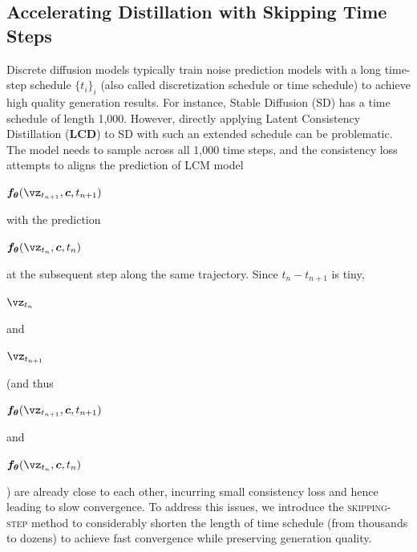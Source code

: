 \documentclass{article} %
\begin{document}
\vspace{-10pt}
\subsection{Accelerating Distillation with Skipping Time Steps \label{sec:skipping_step}}
\vspace{-5pt}
Discrete diffusion models \citep{ho2020denoising, song2019generative} typically train noise prediction models with a long time-step schedule $\{t_i\}_i$ (also called discretization schedule or time schedule) to achieve high quality generation results. For instance, Stable Diffusion (SD) has a time schedule of length 1,000. However, directly applying Latent Consistency Distillation (\textbf{LCD}) to SD with such an extended schedule can be problematic. The model needs to sample across all 1,000 time steps, and the consistency loss attempts to aligns the prediction of LCM model \begin{small}$\boldsymbol{f_\theta}(\boldsymbol{\vz}_{t_{n+1}}, \boldsymbol{c}, t_{n+1})$\end{small} with
the prediction \begin{small}$\boldsymbol{f_\theta}(\boldsymbol{\vz}_{t_n}, \boldsymbol{c}, t_{n})$\end{small} at the subsequent step along the same trajectory. Since $t_n-t_{n+1}$ is tiny, \begin{small}$\boldsymbol{\vz}_{t_{n}}$\end{small} and \begin{small}$\boldsymbol{\vz}_{t_{n+1}}$\end{small} (and thus \begin{small}$\boldsymbol{f_\theta}(\boldsymbol{\vz}_{t_{n+1}}, \boldsymbol{c}, t_{n+1})$\end{small} and \begin{small}$\boldsymbol{f_\theta}(\boldsymbol{\vz}_{t_n}, \boldsymbol{c}, t_{n})$\end{small}) are already close to each other, incurring small consistency loss and hence leading to slow convergence. To address this issues, we introduce the \textsc{skipping-step} method to considerably shorten the length of time schedule (from thousands to dozens) to achieve fast convergence while preserving generation quality. 
\end{document}
